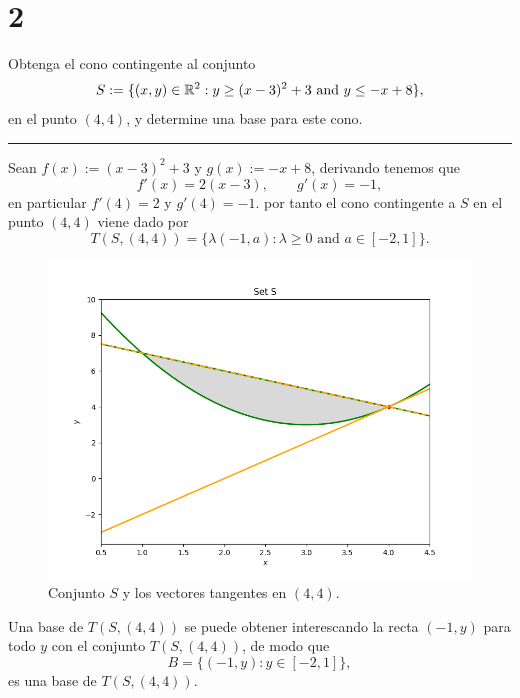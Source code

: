 \section*{2}

Obtenga el cono contingente al conjunto
\begin{equation*}
    S := \{ (x, y) \in \mathbb{R}^2 : y \geq (x - 3)^2 + 3 \text{ and } y \leq -x + 8 \},
\end{equation*}
en el punto $(4, 4)$, y determine una base para este cono.

\noindent\rule{10cm}{0.4pt}

Sean $f(x):= (x - 3)^2 + 3$ y $g(x) := -x + 8$, 
derivando tenemos que
\begin{equation*}
    f'(x) = 2(x - 3), \qquad g'(x) = -1,
\end{equation*}
en particular $f'(4) = 2$ y $g'(4) = -1$.
por tanto el cono contingente a $S$ en el punto $(4, 4)$ viene dado por
\begin{equation*}
    T(S, (4, 4)) = \{ \lambda (-1, a) : \lambda \geq 0 \text{ and } a \in [-2, 1] \}.
\end{equation*}

\begin{figure}[h]
\centering
\includegraphics[scale=0.6]{pec3_ex2_setS.png}
\caption{
    Conjunto $S$ y los vectores tangentes en $(4,4)$.
}
\label{ex2_plot_set}
\end{figure}

Una base de $T(S, (4, 4))$ se puede obtener interescando la recta $(-1, y)$ para todo $y$ con el conjunto $T(S, (4,4))$,
de modo que
\begin{equation*}
    B = \{ (-1, y) : y \in [-2, 1] \},
\end{equation*}
es una base de $T(S, (4, 4))$.

